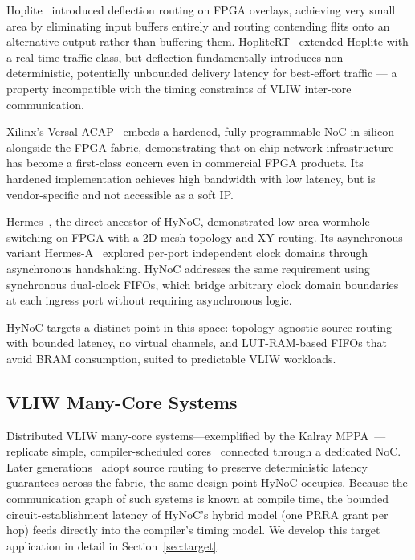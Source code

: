 Hoplite~\cite{kapre2015} introduced deflection routing on FPGA overlays, achieving
very small area by eliminating input buffers entirely and routing contending flits
onto an alternative output rather than buffering them. HopliteRT~\cite{wasly2017}
extended Hoplite with a real-time traffic class, but deflection fundamentally
introduces non-deterministic, potentially unbounded delivery latency for best-effort
traffic — a property incompatible with the timing constraints of VLIW inter-core
communication.

Xilinx's Versal ACAP~\cite{swarbrick2019} embeds a hardened, fully programmable
NoC in silicon alongside the FPGA fabric, demonstrating that on-chip network
infrastructure has become a first-class concern even in commercial FPGA products.
Its hardened implementation achieves high bandwidth with low latency, but is
vendor-specific and not accessible as a soft IP.

Hermes~\cite{moraes2004}, the direct ancestor of HyNoC, demonstrated low-area
wormhole switching on FPGA with a 2D mesh topology and XY routing. Its
asynchronous variant Hermes-A~\cite{pontes2011} explored per-port independent
clock domains through asynchronous handshaking. HyNoC addresses the same
requirement using synchronous dual-clock FIFOs, which bridge arbitrary clock
domain boundaries at each ingress port without requiring asynchronous logic.

HyNoC targets a distinct point in this space: topology-agnostic source routing
with bounded latency, no virtual channels, and LUT-RAM-based FIFOs that avoid
BRAM consumption, suited to predictable VLIW workloads.

\subsection{VLIW Many-Core Systems}

Distributed VLIW many-core systems---exemplified by the Kalray
MPPA~\cite{dinechin2013}---replicate simple, compiler-scheduled
cores~\cite{ellis1986} connected through a dedicated NoC. Later
generations~\cite{dinechin2017} adopt source routing to preserve deterministic
latency guarantees across the fabric, the same design point HyNoC occupies.
Because the communication graph of such systems is known at compile time, the
bounded circuit-establishment latency of HyNoC's hybrid model (one PRRA grant
per hop) feeds directly into the compiler's timing model. We develop this
target application in detail in Section~\ref{sec:target}.

